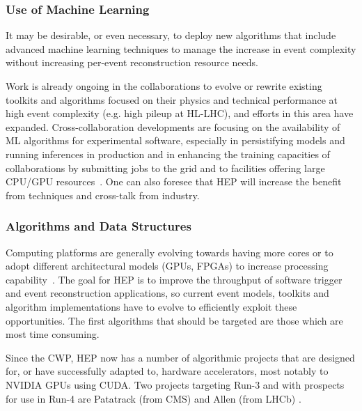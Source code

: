 \hypertarget{use-of-machine-learning-for-software-trigger-and-reconstruction-algorithms}{%
\subsubsection{Use of Machine Learning}\label{use-of-machine-learning-for-software-trigger-and-reconstruction-algorithms}}

It may be desirable, or even necessary, to deploy new algorithms that
include advanced machine learning techniques to manage the
increase in event complexity without increasing per-event
reconstruction resource needs.

Work is already ongoing in the collaborations to evolve or rewrite
existing toolkits and algorithms focused on their physics and technical
performance at high event complexity (e.g. high pileup at HL-LHC), and
efforts in this area have expanded. Cross-collaboration developments are
focusing on the availability of ML algorithms for experimental software,
especially in persistifying models and running inferences in production
and in enhancing the
training capacities of collaborations by submitting jobs to the grid and
to facilities offering large CPU/GPU resources~\cite{LWTNN, ONNX}. One can also foresee
that HEP will increase the benefit from techniques and cross-talk from
industry.

\hypertarget{algorithms-and-data-structures}{%
\subsubsection{Algorithms and Data Structures}\label{algorithms-and-data-structures}}

Computing platforms are generally evolving towards having more cores
or to adopt different
architectural models (GPUs, FPGAs) to increase processing capability~\cite{acm10.1145/3282307}.
The goal for HEP is to improve the throughput of
software trigger and event reconstruction applications, so current
event models, toolkits and algorithm implementations have to evolve to
efficiently exploit these opportunities. The first algorithms that should be
targeted are those which are most time consuming.

Since the CWP, HEP now has a number of algorithmic projects that are
designed for, or have successfully adapted to, hardware accelerators,
most notably to NVIDIA GPUs using CUDA. Two projects targeting Run-3 and
with prospects for use in Run-4 are Patatrack (from CMS) \cite{andrea_bocci_2019_3598824} and
Allen (from LHCb) \cite{Aaij:2019zbu}.


